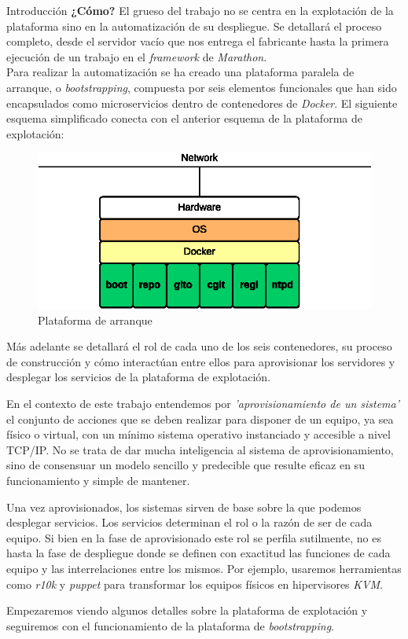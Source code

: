 \documentclass[a4paper,12pt,spanish,final]{epsc_tfc_pfc}
\begin{document}
\begin{intro}{Introducción}
\textbf{¿Cómo?} El grueso del trabajo no se centra en la explotación de la plataforma sino en la automatización de su despliegue. Se detallará el proceso completo, desde el servidor vacío que nos entrega el fabricante hasta la primera ejecución de un trabajo en el \emph{framework} de \emph{Marathon}.\\

Para realizar la automatización se ha creado una plataforma paralela de arranque, o \emph{bootstrapping}, compuesta por seis elementos funcionales que han sido encapsulados como microservicios dentro de contenedores de \emph{Docker}. El siguiente esquema simplificado conecta con el anterior esquema de la plataforma de explotación:

\begin{figure}[h]
  \centering
    \includegraphics[scale=1]{boot_platform}
      \caption{Plataforma de arranque}
\end{figure}

Más adelante se detallará el rol de cada uno de los seis contenedores, su proceso de construcción y cómo interactúan entre ellos para aprovisionar los servidores y desplegar los servicios de la plataforma de explotación.

En el contexto de este trabajo entendemos por \emph{'aprovisionamiento de un sistema'} el conjunto de acciones que se deben realizar para disponer de un equipo, ya sea físico o virtual, con un mínimo sistema operativo instanciado y accesible a nivel TCP/IP\@. No se trata de dar mucha inteligencia al sistema de aprovisionamiento, sino de consensuar un modelo sencillo y predecible que resulte eficaz en su funcionamiento y simple de mantener.

Una vez aprovisionados, los sistemas sirven de base sobre la que podemos desplegar servicios. Los servicios determinan el rol o la razón de ser de cada equipo. Si bien en la fase de aprovisionado este rol se perfila sutilmente, no es hasta la fase de despliegue donde se definen con exactitud las funciones de cada equipo y las interrelaciones entre los mismos. Por ejemplo, usaremos herramientas como \emph{r10k} y \emph{puppet} para transformar los equipos físicos en hipervisores \emph{KVM}.

Empezaremos viendo algunos detalles sobre la plataforma de explotación y seguiremos con el funcionamiento de la plataforma de \emph{bootstrapping}.
\end{intro}
\end{document}
